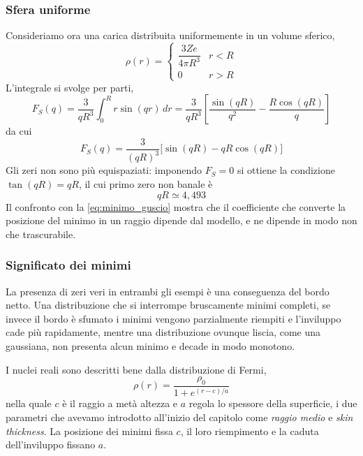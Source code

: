 \subsubsection*{Sfera uniforme}

Consideriamo ora una carica distribuita uniformemente in un volume sferico,
\begin{equation*}
    \rho(r) = \begin{cases} \dfrac{3Ze}{4\pi R^3} & r < R \\[2mm] 0 & r > R \end{cases}
\end{equation*}
L'integrale si svolge per parti,
\begin{equation*}
    F_S(q) = \frac{3}{qR^3}\int_0^{R} r\sin(qr)\,dr = \frac{3}{qR^3}\left[\frac{\sin(qR)}{q^2} - \frac{R\cos(qR)}{q}\right]
\end{equation*}
da cui
\begin{equation}
    F_S(q) = \frac{3}{(qR)^3}\Big[\sin(qR) - qR\cos(qR)\Big]
    \label{eq:F_sfera}
\end{equation}
Gli zeri non sono più equispaziati: imponendo $F_S = 0$ si ottiene la condizione $\tan(qR) = qR$, il cui primo zero non banale è
\begin{equation}
    qR \simeq 4{,}493
    \label{eq:minimo_sfera}
\end{equation}
Il confronto con la \eqref{eq:minimo_guscio} mostra che il coefficiente che converte la posizione del minimo in un raggio dipende dal modello, e ne dipende in modo non che trascurabile.

\subsubsection*{Significato dei minimi}

La presenza di zeri veri in entrambi gli esempi è una conseguenza del bordo netto. Una distribuzione che si interrompe bruscamente minimi completi, se invece il bordo è sfumato i minimi vengono parzialmente riempiti e l'inviluppo cade più rapidamente, mentre una distribuzione ovunque liscia, come una gaussiana, non presenta alcun minimo e decade in modo monotono.

I nuclei reali sono descritti bene dalla distribuzione di Fermi,
\begin{equation}
    \rho(r) = \frac{\rho_0}{1+e^{(r-c)/a}}
    \label{eq:woods_saxon}
\end{equation}
nella quale $c$ è il raggio a metà altezza e $a$ regola lo spessore della superficie, i due parametri che avevamo introdotto all'inizio del capitolo come \emph{raggio medio} e \emph{skin thickness}. La posizione dei minimi fissa $c$, il loro riempimento e la caduta dell'inviluppo fissano $a$.

